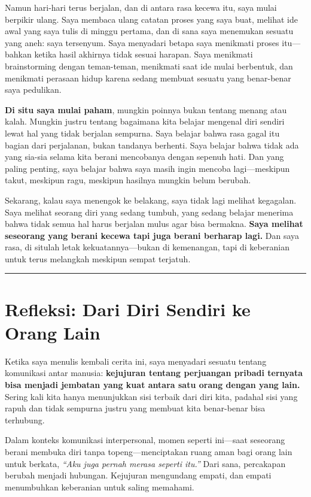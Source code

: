 \documentclass[
  letterpaper,
  DIV=11,
  numbers=noendperiod]{scrreprt}
\begin{document}
Namun hari-hari terus berjalan, dan di antara rasa kecewa itu, saya
mulai berpikir ulang. Saya membaca ulang catatan proses yang saya buat,
melihat ide awal yang saya tulis di minggu pertama, dan di sana saya
menemukan sesuatu yang aneh: saya tersenyum. Saya menyadari betapa saya
menikmati proses itu---bahkan ketika hasil akhirnya tidak sesuai
harapan. Saya menikmati brainstorming dengan teman-teman, menikmati saat
ide mulai berbentuk, dan menikmati perasaan hidup karena sedang membuat
sesuatu yang benar-benar saya pedulikan.

\textbf{Di situ saya mulai paham}, mungkin poinnya bukan tentang menang
atau kalah. Mungkin justru tentang bagaimana kita belajar mengenal diri
sendiri lewat hal yang tidak berjalan sempurna. Saya belajar bahwa rasa
gagal itu bagian dari perjalanan, bukan tandanya berhenti. Saya belajar
bahwa tidak ada yang sia-sia selama kita berani mencobanya dengan
sepenuh hati. Dan yang paling penting, saya belajar bahwa saya masih
ingin mencoba lagi---meskipun takut, meskipun ragu, meskipun hasilnya
mungkin belum berubah.

Sekarang, kalau saya menengok ke belakang, saya tidak lagi melihat
kegagalan. Saya melihat seorang diri yang sedang tumbuh, yang sedang
belajar menerima bahwa tidak semua hal harus berjalan mulus agar bisa
bermakna. \textbf{Saya melihat seseorang yang berani kecewa tapi juga
berani berharap lagi.} Dan saya rasa, di situlah letak
kekuatannya---bukan di kemenangan, tapi di keberanian untuk terus
melangkah meskipun sempat terjatuh.

\begin{center}\rule{0.5\linewidth}{0.5pt}\end{center}

\section{\texorpdfstring{\textbf{Refleksi: Dari Diri Sendiri ke Orang
Lain}}{Refleksi: Dari Diri Sendiri ke Orang Lain}}\label{refleksi-dari-diri-sendiri-ke-orang-lain}

Ketika saya menulis kembali cerita ini, saya menyadari sesuatu tentang
komunikasi antar manusia: \textbf{kejujuran tentang perjuangan pribadi
ternyata bisa menjadi jembatan yang kuat antara satu orang dengan yang
lain.} Sering kali kita hanya menunjukkan sisi terbaik dari diri kita,
padahal sisi yang rapuh dan tidak sempurna justru yang membuat kita
benar-benar bisa terhubung.

Dalam konteks komunikasi interpersonal, momen seperti ini---saat
seseorang berani membuka diri tanpa topeng---menciptakan ruang aman bagi
orang lain untuk berkata, \emph{``Aku juga pernah merasa seperti itu.''}
Dari sana, percakapan berubah menjadi hubungan. Kejujuran mengundang
empati, dan empati menumbuhkan keberanian untuk saling memahami.
\end{document}
